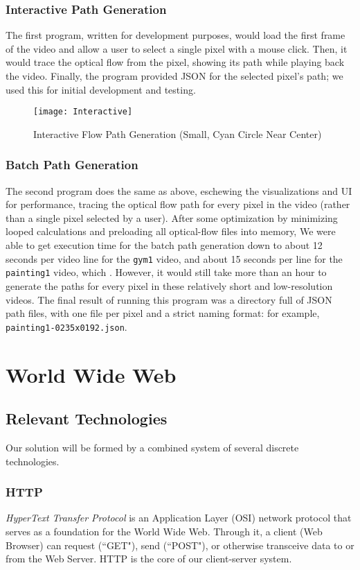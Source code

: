 \subsubsection{Interactive Path Generation}
The first program, written for development purposes, would load the first frame of the video and allow a user to select a single pixel with a mouse click. Then, it would trace the optical flow from the pixel, showing its path while playing back the video. Finally, the program provided JSON for the selected pixel's path; we used this for initial development and testing.

\begin{figure}[h]
\centering
\texttt{[image: Interactive]}
\caption{Interactive Flow Path Generation (Small, Cyan Circle Near Center)}
\end{figure}

\subsubsection{Batch Path Generation}
The second program does the same as above, eschewing the visualizations and UI for performance, tracing the optical flow path for every pixel in the video (rather than a single pixel selected by a user). After some optimization by minimizing looped calculations and preloading all optical-flow files into memory, We were able to get execution time for the batch path generation down to about 12 seconds per video line for the \texttt{gym1} video, and about 15 seconds per line for the \texttt{painting1} video, which . However, it would still take more than an hour to generate the paths for every pixel in these relatively short and low-resolution videos. The final result of running this program was a directory full of JSON path files, with one file per pixel and a strict naming format: for example, \texttt{painting1-0235x0192.json}.




\section{World Wide Web}
\subsection{Relevant Technologies}
Our solution will be formed by a combined system of several discrete technologies.
\subsubsection{HTTP}
\emph{HyperText Transfer Protocol} is an Application Layer (OSI) network protocol that serves as a foundation for the World Wide Web. Through it, a client (Web Browser) can request (``GET"), send (``POST"), or otherwise transceive data to or from the Web Server. HTTP is the core of our client-server system.\cite{http}
